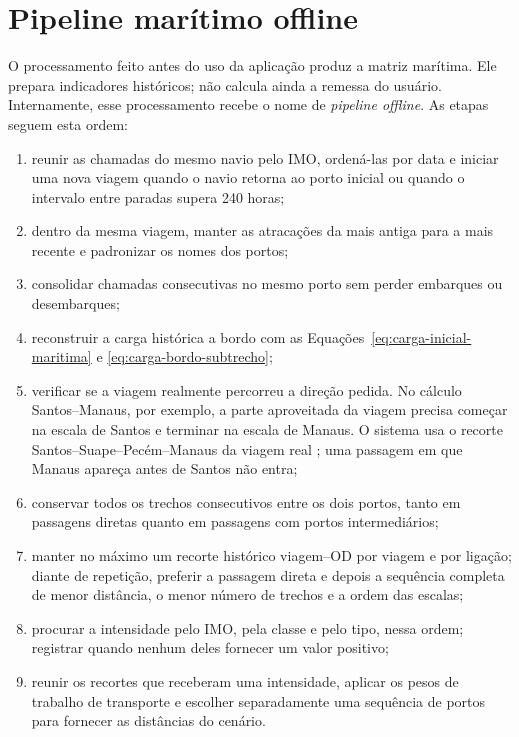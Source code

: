 \section{Pipeline marítimo offline}
\label{sec:pipeline-maritimo-offline}

O processamento feito antes do uso da aplicação produz a matriz marítima. Ele prepara indicadores históricos; não calcula ainda a remessa do usuário. Internamente, esse processamento recebe o nome de \emph{pipeline offline}. As etapas seguem esta ordem:

\begin{enumerate}
  \item reunir as chamadas do mesmo navio pelo IMO, ordená-las por data e iniciar uma nova viagem quando o navio retorna ao porto inicial ou quando o intervalo entre paradas supera 240 horas;
  \item dentro da mesma viagem, manter as atracações da mais antiga para a mais recente e padronizar os nomes dos portos;
  \item consolidar chamadas consecutivas no mesmo porto sem perder embarques ou desembarques;
  \item reconstruir a carga histórica a bordo com as Equações~\ref{eq:carga-inicial-maritima} e \ref{eq:carga-bordo-subtrecho};
  \item verificar se a viagem realmente percorreu a direção pedida. No cálculo Santos--Manaus, por exemplo, a parte aproveitada da viagem precisa começar na escala de Santos e terminar na escala de Manaus. O sistema usa o recorte Santos--Suape--Pecém--Manaus da viagem real ; uma passagem em que Manaus apareça antes de Santos não entra;
  \item conservar todos os trechos consecutivos entre os dois portos, tanto em passagens diretas quanto em passagens com portos intermediários;
  \item manter no máximo um recorte histórico viagem--OD por viagem e por ligação; diante de repetição, preferir a passagem direta e depois a sequência completa de menor distância, o menor número de trechos e a ordem das escalas;
  \item procurar a intensidade pelo IMO, pela classe e pelo tipo, nessa ordem; registrar quando nenhum deles fornecer um valor positivo;
  \item reunir os recortes que receberam uma intensidade, aplicar os pesos de trabalho de transporte e escolher separadamente uma sequência de portos para fornecer as distâncias do cenário.
\end{enumerate}

